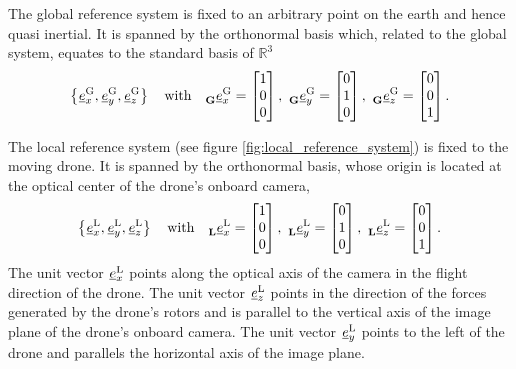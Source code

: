 The global reference system
is fixed to an arbitrary point on the earth
and hence quasi inertial.
It is spanned by the orthonormal basis
which, related to the global system,
equates to the standard basis of $\mathbb{R}^3$
\begin{equation}
    \left\{
        \unitvec[]{\text G}{x}{}{},
        \unitvec[]{\text G}{y}{}{},
        \unitvec[]{\text G}{z}{}{}
    \right\}
    \quad \text{with} \quad 
    \unitvec[]{\text G}{x}{\grs}{} = \begin{bmatrix} 1 \\ 0 \\ 0 \end{bmatrix},\ 
    \unitvec[]{\text G}{y}{\grs}{} = \begin{bmatrix} 0 \\ 1 \\ 0 \end{bmatrix},\ 
    \unitvec[]{\text G}{z}{\grs}{} = \begin{bmatrix} 0 \\ 0 \\ 1 \end{bmatrix}.
\end{equation}


The local reference system (see figure \ref{fig:local_reference_system}) is fixed to the moving drone.
It is spanned by the orthonormal basis,
whose origin is located at the optical center of the drone's onboard camera,
\begin{equation}
    \left\{
        \unitvec[]{\text L}{x}{}{},
        \unitvec[]{\text L}{y}{}{},
        \unitvec[]{\text L}{z}{}{}
    \right\}
    \quad \text{with} \quad 
    \unitvec[]{\text L}{x}{\lrs}{} = \begin{bmatrix} 1 \\ 0 \\ 0 \end{bmatrix},\ 
    \unitvec[]{\text L}{y}{\lrs}{} = \begin{bmatrix} 0 \\ 1 \\ 0 \end{bmatrix},\ 
    \unitvec[]{\text L}{z}{\lrs}{} = \begin{bmatrix} 0 \\ 0 \\ 1 \end{bmatrix}.
\end{equation}
The unit vector 
$\unitvec[]{\text L}{x}{}{}$ 
points along the optical axis of the camera
in the flight direction of the drone.
The unit vector
$\unitvec[]{\text L}{z}{}{}$ 
points in the direction of the forces generated by the drone's rotors
and is parallel to the vertical axis of the image plane of the drone's onboard camera.
The unit vector 
$\unitvec[]{\text L}{y}{}{}$ 
points to the left of the drone
and parallels the horizontal axis of the image plane.






